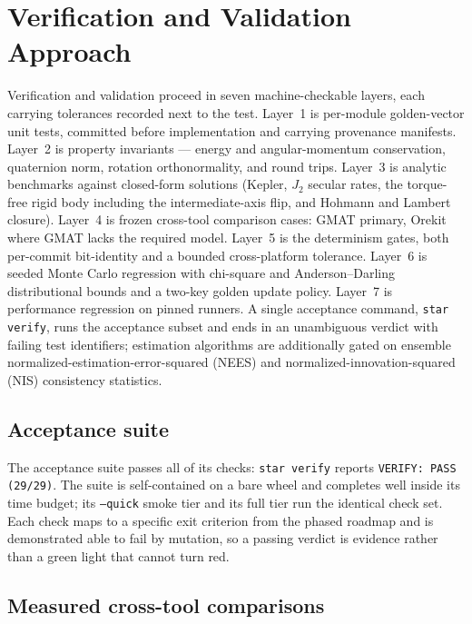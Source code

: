 \documentclass[10pt]{article}
\begin{document}
\section{Verification and Validation Approach}
\label{sec:vv}

Verification and validation proceed in seven machine-checkable layers, each
carrying tolerances recorded next to the test. Layer~1 is per-module
golden-vector unit tests, committed before implementation and carrying
provenance manifests. Layer~2 is property invariants --- energy and
angular-momentum conservation, quaternion norm, rotation orthonormality, and
round trips. Layer~3 is analytic benchmarks against closed-form solutions
(Kepler, $J_2$ secular rates, the torque-free rigid body including the
intermediate-axis flip, and Hohmann and Lambert closure). Layer~4 is frozen
cross-tool comparison cases: GMAT primary, Orekit where GMAT lacks the required
model. Layer~5 is the determinism gates, both per-commit bit-identity and a
bounded cross-platform tolerance. Layer~6 is seeded Monte Carlo regression with
chi-square and Anderson--Darling distributional bounds and a two-key golden
update policy. Layer~7 is performance regression on pinned runners. A single
acceptance command, \texttt{star verify}, runs the acceptance subset and ends
in an unambiguous verdict with failing test identifiers; estimation algorithms
are additionally gated on ensemble normalized-estimation-error-squared (NEES)
and normalized-innovation-squared (NIS) consistency statistics.

\subsection{Acceptance suite}
\label{sec:vv-acceptance}

The acceptance suite passes all of its checks: \texttt{star verify} reports
\texttt{VERIFY: PASS (29/29)}. The suite is self-contained on a bare wheel and
completes well inside its time budget; its \texttt{--quick} smoke tier and its
full tier run the identical check set. Each check maps to a specific exit
criterion from the phased roadmap and is demonstrated able to fail by mutation,
so a passing verdict is evidence rather than a green light that cannot turn red.

\subsection{Measured cross-tool comparisons}
\label{sec:vv-crosstool}
\end{document}
